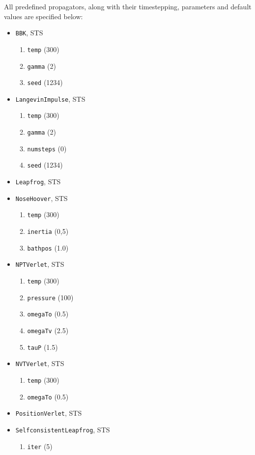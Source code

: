 \documentclass[11pt]{report}
\begin{document}
All predefined propagators, along with their timestepping, parameters and default values are specified below:

\begin{itemize}
\item \texttt{BBK}, STS
\begin{enumerate}
\item \texttt{temp} (300)
\item \texttt{gamma} (2)
\item \texttt{seed} (1234)
\end{enumerate}
\item \texttt{LangevinImpulse}, STS
\begin{enumerate}
\item \texttt{temp} (300)
\item \texttt{gamma} (2)
\item \texttt{numsteps} (0)
\item \texttt{seed} (1234)
\end{enumerate}
\item \texttt{Leapfrog}, STS
\item \texttt{NoseHoover}, STS
\begin{enumerate}
\item \texttt{temp} (300)
\item \texttt{inertia} (0,5)
\item \texttt{bathpos} (1.0)
\end{enumerate}
\item \texttt{NPTVerlet}, STS
\begin{enumerate}
\item \texttt{temp} (300)
\item \texttt{pressure} (100)
\item \texttt{omegaTo} (0.5)
\item \texttt{omegaTv} (2.5)
\item \texttt{tauP} (1.5)
\end{enumerate}
\item \texttt{NVTVerlet}, STS
\begin{enumerate}
\item \texttt{temp} (300)
\item \texttt{omegaTo} (0.5)
\end{enumerate}
\item \texttt{PositionVerlet}, STS
\item \texttt{SelfconsistentLeapfrog}, STS
\begin{enumerate}
\item \texttt{iter} (5)

\end{enumerate}
\end{itemize}
\end{document}
